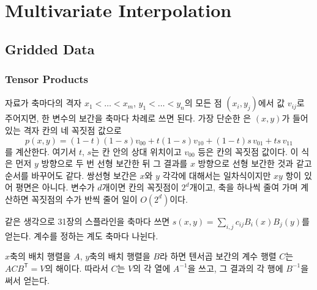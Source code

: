 \chapter{Multivariate Interpolation}
\label{ch:multivariate-interp}


\section{Gridded Data}
\label{sec:grid-interp}

\subsection{Tensor Products}

자료가 축마다의 격자 $x_1<\dots<x_m$, $y_1<\dots<y_n$의 모든 점 $(x_i,y_j)$에서 값 $v_{ij}$로 주어지면, 한 변수의 보간을 축마다 차례로 쓰면 된다. 가장 단순한 은 $(x,y)$가 들어 있는 격자 칸의 네 꼭짓점 값으로
\[
p(x,y)=(1-t)(1-s)v_{00}+t(1-s)v_{10}+(1-t)s\,v_{01}+ts\,v_{11}
\]
를 계산한다. 여기서 $t$, $s$는 칸 안의 상대 위치이고 $v_{00}$ 등은 칸의 꼭짓점 값이다. 이 식은 먼저 $y$ 방향으로 두 번 선형 보간한 뒤 그 결과를 $x$ 방향으로 선형 보간한 것과 같고 순서를 바꾸어도 같다. 쌍선형 보간은 $x$와 $y$ 각각에 대해서는 일차식이지만 $xy$ 항이 있어 평면은 아니다. 변수가 $d$개이면 칸의 꼭짓점이 $2^d$개이고, 축을 하나씩 줄여 가며 계산하면 꼭짓점의 수가 반씩 줄어 일이 $O(2^d)$이다.

같은 생각으로 31장의 스플라인을 축마다 쓰면  $s(x,y)=\sum_{i,j}c_{ij}B_i(x)B_j(y)$를 얻는다. 계수를 정하는 계도 축마다 나뉜다.

\begin{proposition}
\label{prop:tensor-collocation}
$x$축의 배치 행렬을 $A$, $y$축의 배치 행렬을 $B$라 하면 텐서곱 보간의 계수 행렬 $C$는 $ACB^{\mathsf T}=V$의 해이다. 따라서 $C$는 $V$의 각 열에 $A^{-1}$을 쓰고, 그 결과의 각 행에 $B^{-1}$을 써서 얻는다.
\end{proposition}

